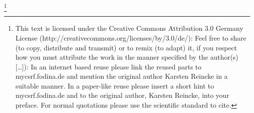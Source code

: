 %
%
%

\footnote{
This text is licensed under the Creative Commons Attribution 3.0 Germany License
(http://creativecommons.org/licenses/by/3.0/de/): Feel free \glqq{}to share (to
copy, distribute and transmit)\grqq{} or \glqq{}to remix (to adapt)\grqq{} it,
if you respect how \glqq{}you must attribute the work in the manner specified by
the author(s)
[\ldots]\grqq{}):
\newline
In an internet based reuse please link the reused parts to mycsrf.fodina.de and
mention the original author Karsten Reincke in a suitable manner. In a
paper-like reuse please insert a short hint to mycsrf.fodina.de and to the
original author, Karsten Reincke, into your preface. For normal quotations
please use the scientific standard to cite.
}


